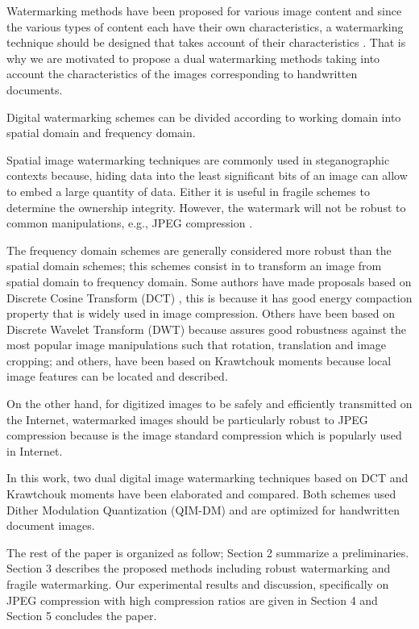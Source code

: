 \documentclass[runningheads]{llncs}
\begin{document}
Watermarking methods have been proposed for various image content and since the various types of content each have their own characteristics, a watermarking technique should be designed that takes account of their characteristics \cite{kang2018spherical}. That is why we are motivated to propose a dual watermarking methods taking into account the characteristics of the images corresponding to handwritten documents.

Digital watermarking schemes can be divided according to working domain into spatial domain and frequency domain.

Spatial image watermarking techniques are commonly used in steganographic contexts because, hiding data into the least significant bits of an image can allow to embed a large quantity of data. Either it is useful in fragile schemes to determine the ownership integrity. However, the watermark will not be robust to common manipulations, e.g., JPEG compression \cite{cardamone2018dwt}.

The frequency domain schemes are generally considered more robust than the spatial domain schemes; this schemes consist in to transform an image from spatial domain to frequency domain. Some authors have made proposals based on Discrete Cosine Transform (DCT) \cite{munoz2018robust,wang2018blind}, this is because it has good energy compaction property that is widely used in image compression. Others have been based on Discrete Wavelet Transform (DWT) \cite{cardamone2018dwt} because assures good robustness against the most popular image manipulations such that rotation, translation and image cropping; and others, have been based on Krawtchouk moments \cite{avila2018watermarking,liu2017fractional,papakostas2014moment,Yap2004} because local image features can be located and described.

On the other hand, for digitized images to be safely and efficiently transmitted on the Internet, watermarked images should be particularly robust to JPEG compression because is the image standard compression which is popularly used in Internet.

In this work, two dual digital image watermarking techniques based on DCT and Krawtchouk moments have been elaborated and compared. Both schemes used Dither Modulation Quantization (QIM-DM) and are optimized for handwritten document images. 

The rest of the paper is organized as follow; Section 2 summarize a preliminaries. Section 3 describes the proposed methods including robust watermarking and fragile watermarking. Our experimental results and discussion, specifically on JPEG compression with high compression ratios are given in Section 4 and Section 5 concludes the paper.
\end{document}
